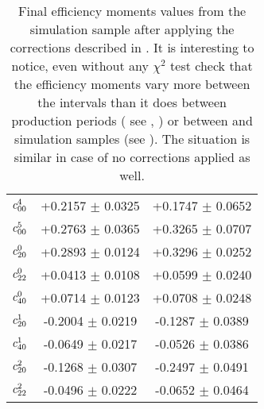 \begin{table}
\begin{tabular}{c c c}
  $c^{4}_{00}$   &  +0.2157 $\pm$  0.0325  &  +0.1747 $\pm$  0.0652  \\
  $c^{5}_{00}$   &  +0.2763 $\pm$  0.0365  &  +0.3265 $\pm$  0.0707  \\
  $c^{0}_{20}$   &  +0.2893 $\pm$  0.0124  &  +0.3296 $\pm$  0.0252  \\
  $c^{0}_{22}$   &  +0.0413 $\pm$  0.0108  &  +0.0599 $\pm$  0.0240  \\
  $c^{0}_{40}$   &  +0.0714 $\pm$  0.0123  &  +0.0708 $\pm$  0.0248  \\
  $c^{1}_{20}$   &  -0.2004 $\pm$  0.0219  &  -0.1287 $\pm$  0.0389  \\
  $c^{1}_{40}$   &  -0.0649 $\pm$  0.0217  &  -0.0526 $\pm$  0.0386  \\
  $c^{2}_{20}$   &  -0.1268 $\pm$  0.0307  &  -0.2497 $\pm$  0.0491  \\
  $c^{2}_{22}$   &  -0.0496 $\pm$  0.0222  &  -0.0652 $\pm$  0.0464  \\
  \hline
\end{tabular}
\caption{Final efficiency moments values from the \BsbarJpsiKst simulation sample after applying the corrections described in
         . It is interesting to notice, even without any $\chi^2$ test check that the
         efficiency moments vary more between the \mkpi intervals than it does between production periods ( see , )
         or between \BsJpsiKst and \BsbarJpsiKst simulation samples (see ). The situation is
         similar in case of no corrections applied as well. }
\label{moms_final_pos}
\end{table}



